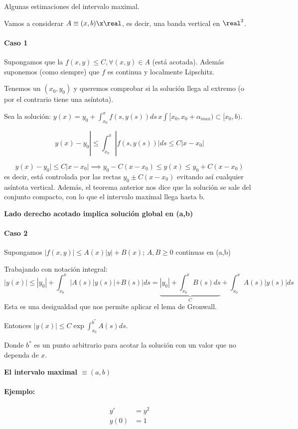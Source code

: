 \documentclass[nochap]{apuntes}
\begin{document}
Algunas estimaciones del intervalo maximal. 

Vamos a considerar $A \equiv (x,b)\x \real$, es decir, una banda vertical en $\real^2$.

\paragraph{Caso 1}
Supongamos que la $f(x,y)\leq C,\forall (x,y)\in A$ (está acotada). Además suponemos (como siempre) que $f$ es continua y localmente Lipschitz.

Tenemos un $(x_0,y_0)$ y queremos comprobar si la solución llega al extremo (o por el contrario tiene una asíntota).

Sea la solución: $\displaystyle y(x) = y_0 + \int_{x_0}^{x} f(s,y(s))ds\, x\int [x_0,x_0+\alpha_{max})\subset [x_0,b)$.

\[y(x) - y_0| \leq \int_{x_0}^x |f(s,y(s))|ds \leq C |x-x_0|\]

\[y(x) - y_0|\leq C |x-x_0| \implies y_0 - C(x-x_0) \leq y(x) \leq y_0 + C(x - x_0)\] es decir, está controlada por las rectas $y_0 \pm C(x-x_0)$ evitando así cualquier asíntota vertical. Además, el teorema anterior nos dice que la solución se sale del conjunto compacto, con lo que el intervalo maximal llega hasta b.

\textbf{Lado derecho acotado implica solución global en (a,b)}

\paragraph{Caso 2} Supongamos $|f(x,y)|\leq A(x)|y| + B(x);\, A,B\ge 0$ continuas en (a,b)

Trabajando con notación integral:
\[|y(x)| \leq  |y_0| + \int_{x_0}^x | A(s)|y(s)| + B(s)|ds = \underbrace{|y_0| + \int_{x_0}^x B(s)ds}_{C} + \int_{x_0}^x A(s)|y(s)|ds \]
Esta es una desigualdad que nos permite aplicar el lema de Gronwall.

Entonces $|y(x)| \leq C \exp{\int_{x_0}^{b^{\ast}} A(s)ds }$.

Donde $b^{\ast}$ es un punto arbitrario para acotar la solución con un valor que no dependa de $x$.

\textbf{El intervalo maximal $\equiv (a,b)$}


\paragraph{Ejemplo:} 
\[\begin{array}{cc}
y'&=y^2\\
y(0)&=1
\end{array}\]
\end{document}
